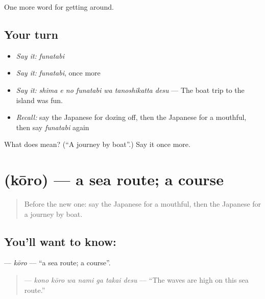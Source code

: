 \begin{grammarlens}[title={What you've built}]
One more word for getting around.
\end{grammarlens}

\subsection*{Your turn}
\begin{itemize}
\raggedright
  \item \emph{Say it:} \emph{funatabi}
  \item \emph{Say it:} \emph{funatabi}, once more
  \item \emph{Say it:} \emph{shima e no funatabi wa tanoshikatta desu} — The boat trip to the island was fun.
  \item \emph{Recall:} say the Japanese for dozing off, then the Japanese for a mouthful, then say \emph{funatabi} again
\end{itemize}

\begin{tcolorbox}[breakable,colback=teal!4,colframe=teal!35!black,title={Before you move on}]
What does  mean? (\textquotedblleft{}A journey by boat\textquotedblright{}.) Say it once more.
\end{tcolorbox}
\section[\texorpdfstring{\ja{こうろ} (kōro)}{こうろ (kōro)}]{ (kōro) — a sea route; a course}

\label{lesson:JA-C381-kouro}



\begin{quote}
Before the new one: say the Japanese for a mouthful, then the Japanese for a journey by boat.
\end{quote}

\subsection*{You'll want to know: }
\textbf{} — \emph{kōro} — \textquotedblleft{}a sea route; a course\textquotedblright{}.

\begin{quote}
\textbf{   } — \emph{kono kōro wa nami ga takai desu} — \textquotedblleft{}The waves are high on this sea route.\textquotedblright{}
\end{quote}


